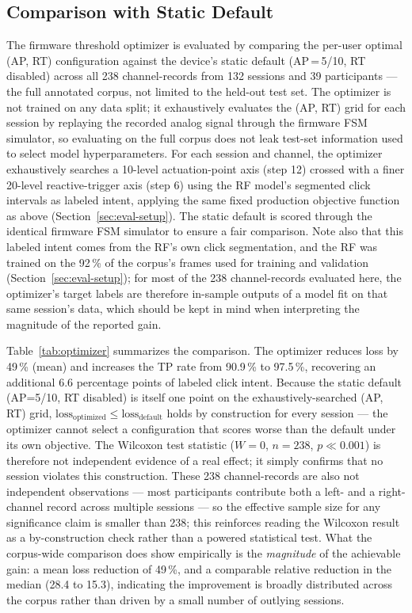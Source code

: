\subsection{Comparison with Static Default}
The firmware threshold optimizer is evaluated by comparing the per-user optimal
(AP, RT) configuration against the device's static default (AP\,=\,5/10, RT disabled)
across all 238 channel-records from 132 sessions and 39 participants --- the full
annotated corpus, not limited to the held-out test set. The optimizer is not trained
on any data split; it exhaustively evaluates the (AP, RT) grid for each session by
replaying the recorded analog signal through the firmware FSM simulator, so evaluating
on the full corpus does not leak test-set information used to select model
hyperparameters. For each session
and channel, the optimizer exhaustively searches a 10-level actuation-point axis
(step 12) crossed with a finer 20-level reactive-trigger axis (step 6) using the
RF model's segmented click intervals as labeled intent, applying the same fixed
production objective function as above (Section~\ref{sec:eval-setup}). The
static default is scored through the identical firmware FSM simulator to ensure a fair
comparison. Note also that this labeled intent comes from the RF's own click
segmentation, and the RF was trained on the 92\,\% of the corpus's frames used for
training and validation (Section~\ref{sec:eval-setup}); for most of the 238
channel-records evaluated here, the optimizer's target labels are therefore in-sample
outputs of a model fit on that same session's data, which should be kept in mind when
interpreting the magnitude of the reported gain.

Table~\ref{tab:optimizer} summarizes the comparison. The optimizer reduces loss by
49\,\% (mean) and increases the TP rate from 90.9\,\%
to 97.5\,\%, recovering an additional 6.6 percentage points of labeled click intent.
Because the static default (AP=5/10, RT disabled) is itself one point on the
exhaustively-searched (AP, RT) grid, $\text{loss}_{\text{optimized}} \le
\text{loss}_{\text{default}}$ holds by construction for every session --- the
optimizer cannot select a configuration that scores worse than the default under its
own objective. The Wilcoxon test statistic ($W=0$, $n=238$, $p \ll 0.001$) is
therefore not independent evidence of a real effect; it simply confirms that no
session violates this construction. These 238 channel-records are also not
independent observations --- most participants contribute both a left- and a
right-channel record across multiple sessions --- so the effective sample size for
any significance claim is smaller than 238; this reinforces reading the Wilcoxon
result as a by-construction check rather than a powered statistical test. What the
corpus-wide comparison does show empirically is the \emph{magnitude} of the
achievable gain: a mean loss reduction of 49\,\%, and a comparable relative
reduction in the median (28.4 to 15.3), indicating the improvement is broadly
distributed across the corpus rather than driven by a small number of outlying
sessions.

